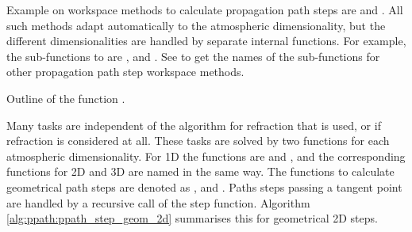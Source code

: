 Example on workspace methods to calculate propagation path steps are
 and
. All such methods adapt
automatically to the atmospheric dimensionality, but the different
dimensionalities are handled by separate internal functions. For
example, the sub-functions to  are
, 
and . See  to
get the names of the sub-functions for other propagation path step
workspace methods. 

\begin{algorithm}
 \begin{algorithmic}
  \ENDIF
  \ENDIF
 \end{algorithmic}
 \caption{Outline of the function .}
 \label{alg:ppath:ppath_step_geom_2d}
\end{algorithm}

Many tasks are independent of the algorithm for refraction that is
used, or if refraction is considered at all. These tasks are solved by
two functions for each atmospheric dimensionality. For 1D the
functions are  and
, and the corresponding functions for 2D and
3D are named in the same way. The functions to calculate geometrical
path steps are denoted as ,
 and . Paths
steps passing a tangent point are handled by a recursive call of the
step function. Algorithm \ref{alg:ppath:ppath_step_geom_2d} summarises
this for geometrical 2D steps.





